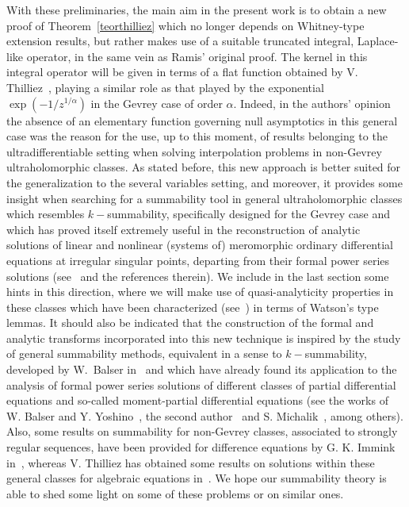 \documentclass[11pt,a4paper,leqno]{article}
\theoremstyle{plain}
\theoremstyle{definition}
\def\a{\alpha}
\begin{document}
With these preliminaries, the main aim in the present work is to obtain a new proof of Theorem~\ref{teorthilliez} which no longer depends on Whitney-type extension results, but rather makes use of a suitable truncated integral, Laplace-like operator, in the same vein as Ramis' original proof. The kernel in this integral operator will be given in terms of a flat function obtained by V. Thilliez~\cite[Thm.\ 2.3.1]{thilliez}, playing a similar role as that played by the exponential $\exp(-1/z^{1/\a})$ in the Gevrey case of order $\a$. Indeed, in the authors' opinion the absence of an elementary function governing null asymptotics in this general case was the reason for the use, up to this moment, of results belonging to the ultradifferentiable setting when solving interpolation problems in non-Gevrey ultraholomorphic classes. As stated before, this new approach is better suited for the generalization to the several variables setting, and moreover, it provides some insight when searching for a summability tool in general ultraholomorphic classes which resembles $k-$summability, specifically designed for the Gevrey case and which has proved itself extremely useful in the reconstruction of analytic solutions of linear and nonlinear (systems of) meromorphic ordinary differential equations at irregular singular points, departing from their formal power series solutions (see~\cite{balser} and the references therein). We include in the last section some hints in this direction, where we will make use of quasi-analyticity properties in these classes which have been characterized (see~\cite{lastrasanz1}) in terms of Watson's type lemmas. It should also be indicated that the construction of the formal and analytic transforms incorporated into this new technique is inspired by the study of general summability methods, equivalent in a sense to $k-$summability, developed by W.~Balser in~\cite[Section\ 5.5]{balser} and which have already found its application to the analysis of formal power series solutions of different classes of partial differential equations and so-called moment-partial differential equations (see the works of W. Balser and Y. Yoshino~\cite{BalserYoshino}, the second author~\cite{Malek1,Malek2} and S. Michalik~\cite{Michalik1,Michalik2,Michalik3,Michalik4}, among others).
Also, some results on summability for non-Gevrey classes, associated to strongly regular sequences, have been provided for difference equations
by G. K. Immink in~\cite{Immink}, whereas V. Thilliez has obtained some results on solutions within these general classes for algebraic equations in~\cite{Thilliez2}.
We hope our summability theory is able to shed some light on some of these problems or on similar ones.
\end{document}
